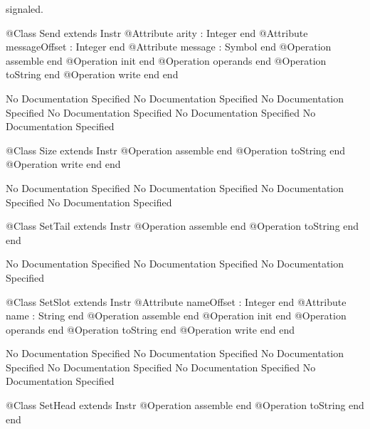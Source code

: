       signaled.
\begin{Interface}
@Class Send extends Instr
  @Attribute arity : Integer end
  @Attribute messageOffset : Integer end
  @Attribute message : Symbol end
  @Operation assemble end
  @Operation init end
  @Operation operands end
  @Operation toString end
  @Operation write end
end
\end{Interface}
No Documentation Specified
No Documentation Specified
No Documentation Specified
No Documentation Specified
No Documentation Specified
No Documentation Specified
\begin{Interface}
@Class Size extends Instr
  @Operation assemble end
  @Operation toString end
  @Operation write end
end
\end{Interface}
No Documentation Specified
No Documentation Specified
No Documentation Specified
No Documentation Specified
\begin{Interface}
@Class SetTail extends Instr
  @Operation assemble end
  @Operation toString end
end
\end{Interface}
No Documentation Specified
No Documentation Specified
No Documentation Specified
\begin{Interface}
@Class SetSlot extends Instr
  @Attribute nameOffset : Integer end
  @Attribute name : String end
  @Operation assemble end
  @Operation init end
  @Operation operands end
  @Operation toString end
  @Operation write end
end
\end{Interface}
No Documentation Specified
No Documentation Specified
No Documentation Specified
No Documentation Specified
No Documentation Specified
No Documentation Specified
\begin{Interface}
@Class SetHead extends Instr
  @Operation assemble end
  @Operation toString end
end
\end{Interface}
